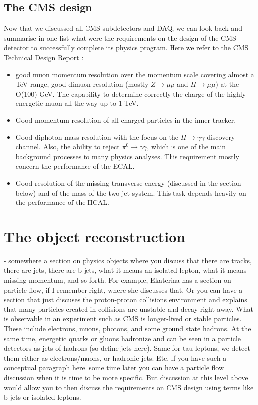 \begin{normalsize}
\subsection{The CMS design}

Now that we discussed all CMS subdetectors and DAQ, we can look back and summarise in one list what were the requirements on the design of the CMS detector to successfully complete its physics program. Here we refer to the CMS Technical Design Report \cite{CMS_TDR}: 


\begin{itemize}
\item good muon momentum resolution over the momentum scale covering almost a TeV range, good dimuon resolution (mostly $Z \rightarrow \mu \mu$ and $H \rightarrow \mu \mu$) at the O(100) GeV. The capability to determine correctly the charge of the highly energetic muon all the way up to 1 TeV. 
\item Good momentum resolution of all charged particles in the inner tracker.
\item Good diphoton mass resolution with the focus on the $H \rightarrow \gamma \gamma$ discovery channel. Also, the ability to reject $\pi^0 \rightarrow \gamma \gamma$, which is one of the main background processes to many physics analyses.  This requirement mostly concern the performance of the ECAL. 
\item Good resolution of the missing transverse energy (discussed in the section below) and of the mass of the two-jet system. This task depends heavily on the performance of the HCAL.
\end{itemize}



\section{The object reconstruction}\label{sec:cms_reconstruction}

  
  - somewhere a section on physics objects where you discuss that there are tracks, there are jets, there are b-jets, what it means an isolated lepton, what it means missing momentum, and so forth. For example, Ekaterina has a section on particle flow, if I remember right, where she discusses that. Or you can have a section that just discuses the proton-proton collisions environment and explains that many particles created in collisions are unstable and decay right away. What is observable in an experiment such as CMS is longer-lived or stable particles. These include electrons, muons, photons, and some ground state hadrons. At the same time, energetic quarks or gluons hadronize and can be seen in a particle detectors as jets of hadrons (so define jets here). Same for tau leptons, we detect them either as electrons/muons, or hadronic jets. Etc. If you have such a conceptual paragraph here, some time later you can have a particle flow discussion when it is time to be more specific. But discussion at this level above would allow you to then discuss the requirements on CMS design using terms like b-jets or isolated leptons.


\end{normalsize}
